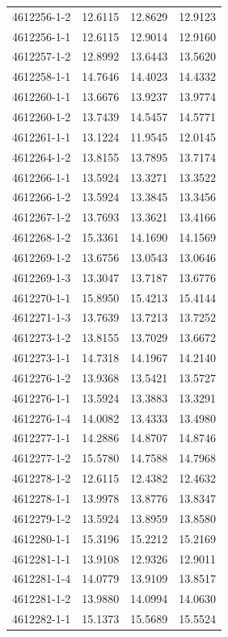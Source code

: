 \begin{longtable}{lrrr}
4612256-1-2 & 12.6115 & 12.8629 & 12.9123 \\
4612256-1-1 & 12.6115 & 12.9014 & 12.9160 \\
4612257-1-2 & 12.8992 & 13.6443 & 13.5620 \\
4612258-1-1 & 14.7646 & 14.4023 & 14.4332 \\
4612260-1-1 & 13.6676 & 13.9237 & 13.9774 \\
4612260-1-2 & 13.7439 & 14.5457 & 14.5771 \\
4612261-1-1 & 13.1224 & 11.9545 & 12.0145 \\
4612264-1-2 & 13.8155 & 13.7895 & 13.7174 \\
4612266-1-1 & 13.5924 & 13.3271 & 13.3522 \\
4612266-1-2 & 13.5924 & 13.3845 & 13.3456 \\
4612267-1-2 & 13.7693 & 13.3621 & 13.4166 \\
4612268-1-2 & 15.3361 & 14.1690 & 14.1569 \\
4612269-1-2 & 13.6756 & 13.0543 & 13.0646 \\
4612269-1-3 & 13.3047 & 13.7187 & 13.6776 \\
4612270-1-1 & 15.8950 & 15.4213 & 15.4144 \\
4612271-1-3 & 13.7639 & 13.7213 & 13.7252 \\
4612273-1-2 & 13.8155 & 13.7029 & 13.6672 \\
4612273-1-1 & 14.7318 & 14.1967 & 14.2140 \\
4612276-1-2 & 13.9368 & 13.5421 & 13.5727 \\
4612276-1-1 & 13.5924 & 13.3883 & 13.3291 \\
4612276-1-4 & 14.0082 & 13.4333 & 13.4980 \\
4612277-1-1 & 14.2886 & 14.8707 & 14.8746 \\
4612277-1-2 & 15.5780 & 14.7588 & 14.7968 \\
4612278-1-2 & 12.6115 & 12.4382 & 12.4632 \\
4612278-1-1 & 13.9978 & 13.8776 & 13.8347 \\
4612279-1-2 & 13.5924 & 13.8959 & 13.8580 \\
4612280-1-1 & 15.3196 & 15.2212 & 15.2169 \\
4612281-1-1 & 13.9108 & 12.9326 & 12.9011 \\
4612281-1-4 & 14.0779 & 13.9109 & 13.8517 \\
4612281-1-2 & 13.9880 & 14.0994 & 14.0630 \\
4612282-1-1 & 15.1373 & 15.5689 & 15.5524 \\

\end{longtable}
